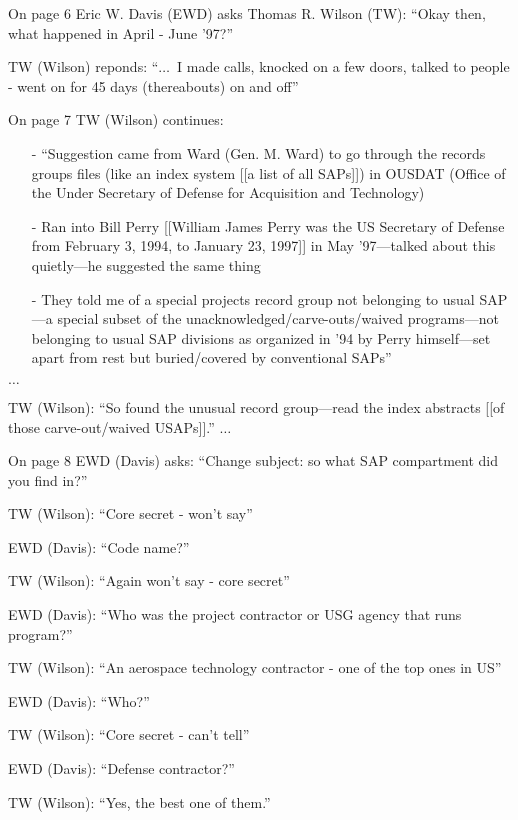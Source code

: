 \begin{svgraybox}
On page 6 Eric W. Davis (EWD) asks Thomas R. Wilson (TW): ``Okay then, what happened in April - June '97?''

TW (Wilson) reponds: ``$\ldots$~I made calls, knocked on a few doors, talked to people - went on for 45 days (thereabouts) on and off''

On page 7 TW (Wilson) continues:
\begin{enumerate}
\item[-]
``Suggestion came from Ward (Gen. M. Ward) to go through the records groups
files (like an index system [[a list of all SAPs]]) in OUSDAT (Office of the Under Secretary of Defense for Acquisition and Technology)
\item[-]
Ran into Bill Perry [[William James Perry  was the US Secretary of Defense from February 3, 1994, to January 23, 1997]] in May '97---talked
about this quietly---he suggested the same thing
\item[-]
They told me of a special projects record group not belonging to usual SAP---a
special subset of the unacknowledged/carve-outs/waived programs---not
belonging to usual SAP divisions as organized in '94 by Perry himself---set
apart from rest but buried/covered by conventional SAPs''
\end{enumerate}
$\ldots$

\noindent TW (Wilson): ``So found the unusual record group---read the index abstracts [[of those carve-out/waived USAPs]].''
$\ldots$



On page 8 EWD (Davis) asks: ``Change subject: so what SAP compartment did you find in?''

\noindent TW (Wilson): ``Core secret - won't say''

\noindent EWD (Davis): ``Code name?''

\noindent TW (Wilson): ``Again won't say - core secret''

\noindent EWD (Davis): ``Who was the project contractor or USG agency that runs program?''

\noindent TW (Wilson): ``An aerospace technology contractor - one of the top ones in US''

\noindent EWD (Davis): ``Who?''

\noindent TW (Wilson): ``Core secret - can't tell''

\noindent EWD (Davis): ``Defense contractor?''

\noindent TW (Wilson): ``Yes, the best one of them.''


\end{svgraybox}
